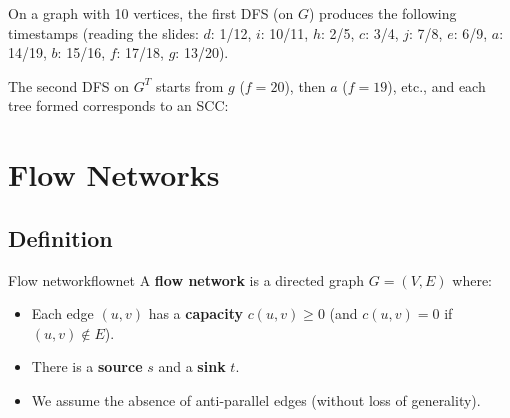 On a graph with 10 vertices, the first DFS (on $G$) produces the
following timestamps (reading the slides: $d$: 1/12, $i$: 10/11, $h$: 2/5, $c$: 3/4,
$j$: 7/8, $e$: 6/9, $a$: 14/19, $b$: 15/16, $f$: 17/18, $g$: 13/20).

The second DFS on $G^T$ starts from $g$ ($f=20$), then $a$ ($f=19$), etc., and
each tree formed corresponds to an SCC:

\begin{center}
\end{center}

\section*{Flow Networks}

\subsection{Definition}

\begin{definition}{Flow network}{flownet}
A \textbf{flow network} is a directed graph $G = (V, E)$ where:
\begin{itemize}[noitemsep]
  \item Each edge $(u,v)$ has a \textbf{capacity} $c(u,v) \ge 0$
        (and $c(u,v) = 0$ if $(u,v) \notin E$).
  \item There is a \textbf{source} $s$ and a \textbf{sink} $t$.
  \item We assume the absence of anti-parallel edges (without loss of generality).
\end{itemize}
\end{definition}

